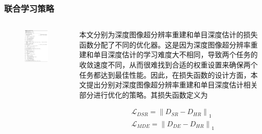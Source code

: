 \documentclass[aspectratio=169,12pt]{beamer}
\begin{document}
\begin{frame}[t]
\frametitle{联合学习策略}	
	\begin{columns}
		\begin{column}{0.35\textwidth}
			\begin{figure}
				\includegraphics[scale=0.45]{19.png}
			\end{figure}
		\end{column}
		\begin{column}{0.65\textwidth}
		\small
		本文分别为深度图像超分辨率重建和单目深度估计的损失函数分配了不同的优化器。这是因为深度图像超分辨率重建和单目深度估计的学习难度大不相同，导致两个任务的收敛速度不同，从而很难找到合适的权重设置来确保两个任务都达到最佳性能。因此，在损失函数的设计方面，本文提出分别对深度图像超分辨率重建和单目深度估计相关部分进行优化的策略。其损失函数定义为
		
		{\footnotesize
		\begin{equation}
			\begin{aligned}
				&\mathcal{L}_{D S R}=\left\|D_{S R}-D_{H R}\right\|_{1} \\
				&\mathcal{L}_{M D E}=\left\|D_{D E}-D_{H R}\right\|_{1}
			\end{aligned}
		\end{equation}

}
\end{column}
\end{columns}
\end{frame}
\end{document}
